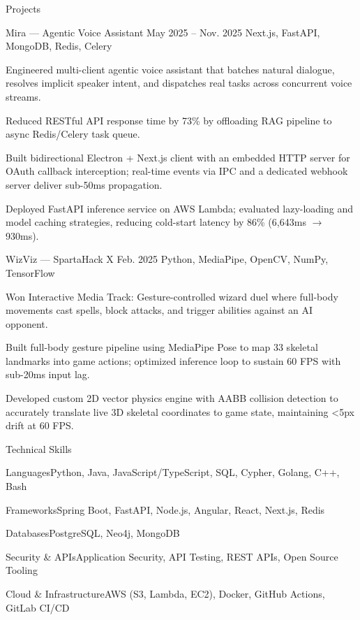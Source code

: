 \documentclass[
	11pt
]{../../../resume}
\begin{document}
	\begin{rSection}{P}{rojects}
		\begin{rSectionEntry}
			{Mira --- Agentic Voice Assistant}
			{May 2025 -- Nov. 2025}
			{}
			{Next.js, FastAPI, MongoDB, Redis, Celery}
			{}

			\item Engineered multi-client agentic voice assistant that batches natural dialogue, resolves implicit speaker intent, and dispatches real tasks across concurrent voice streams.
			\item Reduced RESTful API response time by 73\% by offloading RAG pipeline to async Redis/Celery task queue.
			\item Built bidirectional Electron + Next.js client with an embedded HTTP server for OAuth callback interception; real-time events via IPC and a dedicated webhook server deliver sub-50ms propagation.
			\item Deployed FastAPI inference service on AWS Lambda; evaluated lazy-loading and model caching strategies, reducing cold-start latency by 86\% (6{,}643ms $\rightarrow$ 930ms).
		\end{rSectionEntry}

		\begin{rSectionEntry}
			{WizViz --- SpartaHack X}
			{Feb. 2025}
			{}
			{Python, MediaPipe, OpenCV, NumPy, TensorFlow}
			{}

			\item Won Interactive Media Track: Gesture-controlled wizard duel where full-body movements cast spells, block attacks, and trigger abilities against an AI opponent.
			\item Built full-body gesture pipeline using MediaPipe Pose to map 33 skeletal landmarks into game actions; optimized inference loop to sustain 60 FPS with sub-20ms input lag.
			\item Developed custom 2D vector physics engine with AABB collision detection to accurately translate live 3D skeletal coordinates to game state, maintaining \textless5px drift at 60 FPS.
		\end{rSectionEntry}
	\end{rSection}

	\begin{rSection}{T}{echnical Skills}
		\begin{rSet}{Languages}{Python, Java, JavaScript/TypeScript, SQL, Cypher, Golang, C++, Bash}
		\end{rSet}
		\begin{rSet}{Frameworks}{Spring Boot, FastAPI, Node.js, Angular, React, Next.js, Redis}
		\end{rSet}
		\begin{rSet}{Databases}{PostgreSQL, Neo4j, MongoDB}
		\end{rSet}
		\begin{rSet}{Security \& APIs}{Application Security, API Testing, REST APIs, Open Source Tooling}
		\end{rSet}
		\begin{rSet}{Cloud \& Infrastructure}{AWS (S3, Lambda, EC2), Docker, GitHub Actions, GitLab CI/CD}
		\end{rSet}
	\end{rSection}
\end{document}

